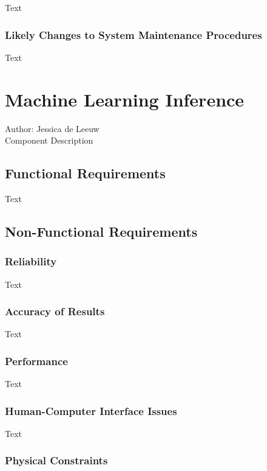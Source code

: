 \documentclass[12pt]{article}
\begin{document}
Text

\subsubsection {Likely Changes to System Maintenance Procedures}

Text

\section{Machine Learning Inference}
Author: Jessica de Leeuw\\

\noindent Component Description

\subsection{Functional Requirements}

Text

\subsection{Non-Functional Requirements}

\subsubsection {Reliability}

Text

\subsubsection {Accuracy of Results}

Text

\subsubsection {Performance}

Text

\subsubsection {Human-Computer Interface Issues}

Text

\subsubsection {Physical Constraints}
\end{document}
